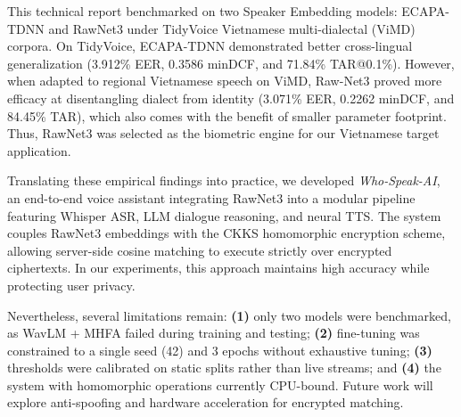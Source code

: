 This technical report benchmarked on two Speaker Embedding models: ECAPA-TDNN and RawNet3 under TidyVoice Vietnamese multi-dialectal (ViMD) corpora. On TidyVoice, ECAPA-TDNN demonstrated better cross-lingual generalization (3.912\% EER, 0.3586 minDCF, and 71.84\% TAR@0.1\%). However, when adapted to regional Vietnamese speech on ViMD, Raw-Net3 proved more efficacy at disentangling dialect from identity (3.071\% EER, 0.2262 minDCF, and 84.45\% TAR), which also comes with the benefit of smaller parameter footprint. Thus, RawNet3 was selected as the biometric engine for our Vietnamese target application.

Translating these empirical findings into practice, we developed \emph{Who-Speak-AI}, an end-to-end voice assistant integrating RawNet3 into a modular pipeline featuring Whisper ASR, LLM dialogue reasoning, and neural TTS. The system couples RawNet3 embeddings with the CKKS homomorphic encryption scheme, allowing server-side cosine matching to execute strictly over encrypted ciphertexts. In our experiments, this approach maintains high accuracy while protecting user privacy.

Nevertheless, several limitations remain: \textbf{(1)} only two models were benchmarked, as WavLM + MHFA failed during training and testing; \textbf{(2)} fine-tuning was constrained to a single seed (42) and 3 epochs without exhaustive tuning; \textbf{(3)} thresholds were calibrated on static splits rather than live streams; and \textbf{(4)} the system with homomorphic operations currently CPU-bound. Future work will explore anti-spoofing and hardware acceleration for encrypted matching.